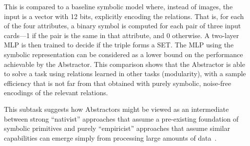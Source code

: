 This is compared to a baseline symbolic model where, instead of images, the input is a vector with 12 bits,
explicitly encoding the relations. That is, for each of the four attributes, a binary symbol is computed for each pair of three input cards---1 if the pair is the same in that attribute, and 0 otherwise. A two-layer MLP is then trained to decide if the triple forms a SET. The MLP using the symbolic representation can be considered as a lower bound on the performance achievable by the Abstractor. This comparison shows that the Abstractor is able to solve a task using relations learned in other tasks (modularity), with a sample efficiency that is not far from that obtained
with purely symbolic, noise-free encodings of the relevant relations. %

This subtask suggests how Abstractors might be viewed as an intermediate between strong ``nativist'' approaches that assume a pre-existing foundation of symbolic primitives and purely ``empiricist'' approaches that assume
similar capabilities can emerge simply from processing large amounts of data~\cite{lake2015}.
